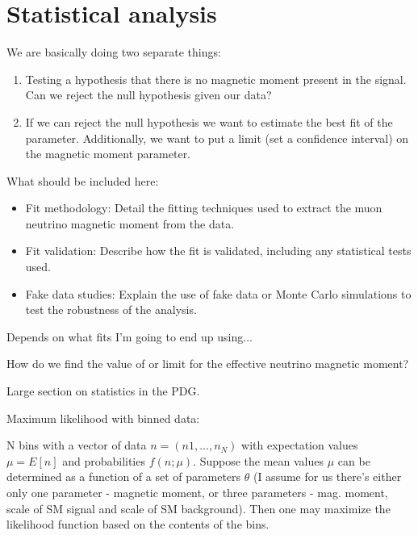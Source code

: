 \section{Statistical analysis}\label{sec:NuMMFitting}

We are basically doing two separate things:
\begin{enumerate}
\item Testing a hypothesis that there is no magnetic moment present in the signal. Can we reject the null hypothesis given our data?
\item If we can reject the null hypothesis we want to estimate the best fit of the parameter. Additionally, we want to put a limit (set a confidence interval) on the magnetic moment parameter.
\end{enumerate}

What should be included here:
\begin{itemize}
\item Fit methodology: Detail the fitting techniques used to extract the muon neutrino magnetic moment from the data.
\item Fit validation: Describe how the fit is validated, including any statistical tests used.
\item Fake data studies: Explain the use of fake data or Monte Carlo simulations to test the robustness of the analysis.
\end{itemize}

\iffalse
Depends on what fits I'm going to end up using...

How do we find the value of or limit for the effective neutrino magnetic moment?

Large section on statistics in the PDG.

Maximum likelihood with binned data:

N bins with a vector of data $n=\left(n1,...,n_N \right)$ with expectation values $\mu=E\left[n\right]$ and probabilities $f\left(n;\mu\right)$. Suppose the mean values $\mu$ can be determined as a function of a set of parameters $\theta$ (I assume for us there's either only one parameter - magnetic moment, or three parameters - mag. moment, scale of SM signal and scale of SM background). Then one may maximize the likelihood function based on the contents of the bins.

